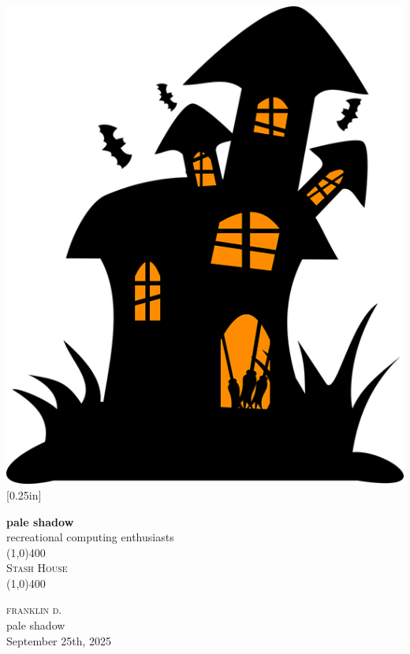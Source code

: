 \documentclass[11pt]{report}
\newcommand{\myTitle}{Stash House}
\newcommand{\myName}{franklin d.}
\newcommand{\myOrg}{pale shadow}
\newcommand{\myDate}{September 25th, 2025}
\begin{document}
	\begin{titlepage}
		\begin{center}
			\includegraphics[scale=0.20]{../static/images/new_logo.png}\\
			[0.25in]

			\textbf{\Large{\myOrg}}\\
			\Large{recreational computing enthusiasts}\\
			[1in]

			\line(1,0){400}\\
			[2mm]
			\textsc{\Large{\myTitle}} \\
			\line(1,0){400} \\
			[1in]
		\end{center}
		\begin{center}
			\textsc{\Large \myName}	\\
			\myOrg\\
			[1in]
			\myDate
		\end{center}
	\end{titlepage}
\end{document}

